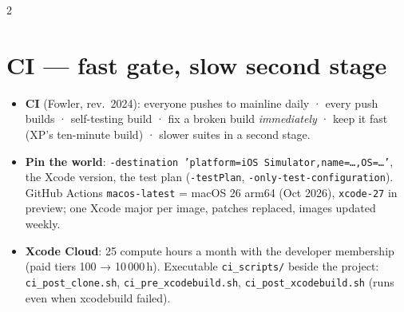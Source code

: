 \documentclass[8pt]{extarticle}
\newcommand\ct[1]{\texttt{#1}}
\begin{document}
\begin{multicols}{2}
\columnbreak

\section{CI — fast gate, slow second stage}
\noindent{}
\begin{itemize}
  \item \textbf{CI} (Fowler, rev.\ 2024): everyone pushes to mainline daily · every push builds ·
        self-testing build · fix a broken build \emph{immediately} · keep it fast (XP's
        ten-minute build) · slower suites in a second stage.
  \item \textbf{Pin the world}: \ct{-destination 'platform=iOS Simulator,name=…,OS=…'}, the Xcode
        version, the test plan (\ct{-testPlan}, \ct{-only-test-configuration}). GitHub Actions
        \ct{macos-latest} = macOS 26 arm64 (Oct 2026), \ct{xcode-27} in preview; one Xcode
        major per image, patches replaced, images updated weekly.
  \item \textbf{Xcode Cloud}: 25 compute hours a month with the developer membership (paid tiers
        100 → 10\,000\,h). Executable \ct{ci\_scripts/} beside the project:
        \ct{ci\_post\_clone.sh}, \ct{ci\_pre\_xcodebuild.sh}, \ct{ci\_post\_xcodebuild.sh}
        (runs even when xcodebuild failed).
\end{itemize}


\end{multicols}
\end{document}
